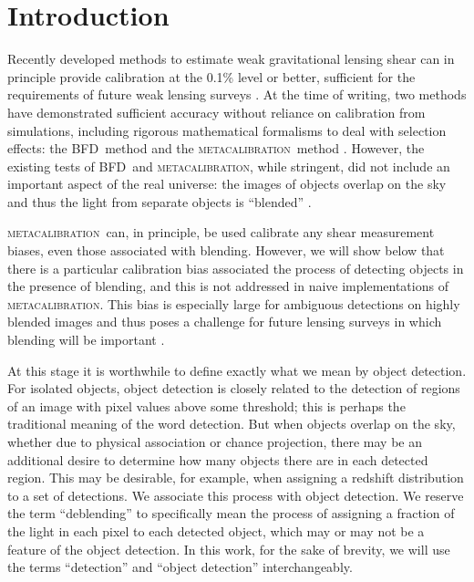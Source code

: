 \documentclass[iop, appendixfloats, numberedappendix, apj]{emulateapj}
\newcommand{\mcal}{\textsc{metacalibration}}
\newcommand{\bfd}{\textsc{BFD}}
\begin{document}
\section{Introduction}

Recently developed methods to estimate weak gravitational lensing shear can in
principle provide calibration at the 0.1\% level or better, sufficient for the
requirements of future weak lensing surveys \citep[e.g.,][]{huterer2006}.  At
the time of writing, two methods have demonstrated sufficient accuracy without
reliance on calibration from simulations, including rigorous mathematical
formalisms to deal with selection effects:  the \bfd\ method
\citep{BernBFD2016} and the \mcal\ method \citep{HuffMcal2017,SheldonMcal2017}.
However, the existing tests of \bfd\ and \mcal, while stringent, did not
include an important aspect of the real universe: the images of objects overlap
on the sky and thus the light from separate objects is ``blended'' \citep[for
discussion of blending effects see, e.g.,][]{DawsonBlending2016}.

\mcal\ can, in principle, be used calibrate any shear measurement biases, even
those associated with blending.  However, we will show below that there is a
particular calibration bias associated the process of detecting objects in the
presence of blending, and this is not addressed in naive implementations of
\mcal. This bias is especially large for ambiguous detections on highly blended
images and thus poses a challenge for future lensing surveys in which
blending will be important \citep{DawsonBlending2016}.

At this stage it is worthwhile to define exactly what we mean by object
detection.  For isolated objects, object detection is closely related to the
detection of regions of an image with pixel values above some threshold; this
is perhaps the traditional meaning of the word detection. But when objects
overlap on the sky, whether due to physical association or chance projection,
there may be an additional desire to determine how many objects there are in
each detected region. This may be desirable, for example, when assigning a
redshift distribution to a set of detections.  We associate this process with
object detection.  We reserve the term ``deblending'' to specifically mean the
process of assigning a fraction of the light in each pixel to each detected
object, which may or may not be a feature of the object detection.  In this
work, for the sake of brevity, we will use the terms ``detection'' and ``object
detection'' interchangeably.
\end{document}
